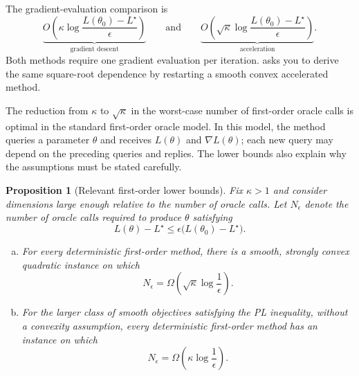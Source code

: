 \documentclass[11pt,twoside]{article}
\newtheorem{proposition}[theorem]{Proposition}
\theoremstyle{definition}
\theoremstyle{remark}
\begin{document}
The gradient-evaluation comparison is
\begin{equation}
 \underbrace{O\left(\kappa
 \log\frac{L(\theta_0)-L^\star}{\epsilon}\right)}
 _{\text{gradient descent}}
 \qquad\text{and}\qquad
 \underbrace{O\left(\sqrt\kappa
 \log\frac{L(\theta_0)-L^\star}{\epsilon}\right)}
 _{\text{acceleration}}.
 \label{eq:gd-acceleration-comparison}
\end{equation}
Both methods require one gradient evaluation per iteration.
 asks you to derive the same square-root
dependence by restarting a smooth convex accelerated method.

The reduction from $\kappa$ to $\sqrt\kappa$ in the worst-case number of
first-order oracle calls is optimal in the standard first-order oracle model.
In this model, the method queries a parameter $\theta$ and receives
$L(\theta)$ and $\nabla L(\theta)$; each new query may depend on the preceding
queries and replies. The lower bounds also explain why the assumptions must be
stated carefully.

\begin{proposition}[Relevant first-order lower bounds]
\label{prop:acceleration-lower-bounds}
Fix $\kappa>1$ and consider dimensions large enough relative to the number of
oracle calls. Let $N_\epsilon$ denote the number of oracle calls required to
produce $\theta$ satisfying
\begin{equation}
 L(\theta)-L^\star
 \le\epsilon\bigl(L(\theta_0)-L^\star\bigr).
 \label{eq:relative-gap-target}
\end{equation}
\begin{enumerate}[(a),leftmargin=*]
\item For every deterministic first-order method, there is a smooth, strongly
convex quadratic instance on which
\begin{equation}
 N_\epsilon
 =\Omega\left(\sqrt\kappa\log\frac1\epsilon\right).
 \label{eq:strongly-convex-lower-bound}
\end{equation}
\item For the larger class of smooth objectives satisfying the PL inequality,
without a convexity assumption, every deterministic first-order method has an
instance on which
\begin{equation}
 N_\epsilon
 =\Omega\left(\kappa\log\frac1\epsilon\right).
 \label{eq:pl-lower-bound}
\end{equation}
\end{enumerate}
\end{proposition}
\end{document}
